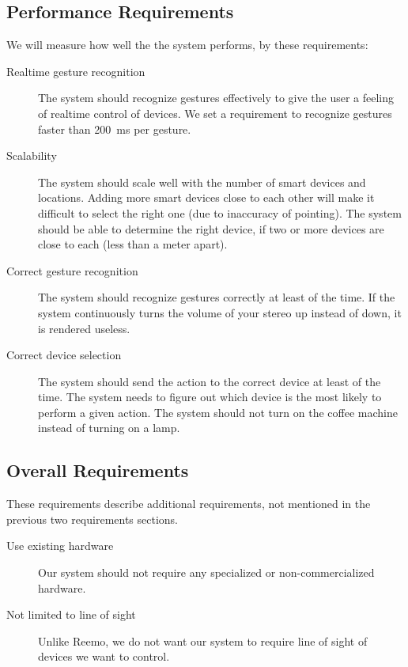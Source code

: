 \subsection{Performance Requirements}
We will measure how well the the system performs, by these requirements:
\begin{description}
    \item[Realtime gesture recognition] The system should recognize gestures effectively to give the user a feeling of realtime control of devices. We set a requirement to recognize gestures faster than \SI{200}{\milli\second} per gesture.
    \item[Scalability] The system should scale well with the number of smart devices and locations. Adding more smart devices close to each other will make it difficult to select the right one (due to inaccuracy of pointing). The system should be able to determine the right device, if two or more devices are close to each (less than a meter apart).
    \item[Correct gesture recognition] The system should recognize gestures correctly at least  of the time. If the system continuously turns the volume of your stereo up instead of down, it is rendered useless.  
    \item[Correct device selection] The system should send the action to the correct device at least  of the time. The system needs to figure out which device is the most likely to perform a given action. The system should not turn on the coffee machine instead of turning on a lamp.
\end{description}
    
\subsection{Overall Requirements}
These requirements describe additional requirements, not mentioned in the previous two requirements sections.
\begin{description}
    \item[Use existing hardware] Our system should not require any specialized or non-commercialized hardware.  
    \item[Not limited to line of sight] Unlike Reemo, we do not want our system to require line of sight of devices we want to control. 
\end{description}
